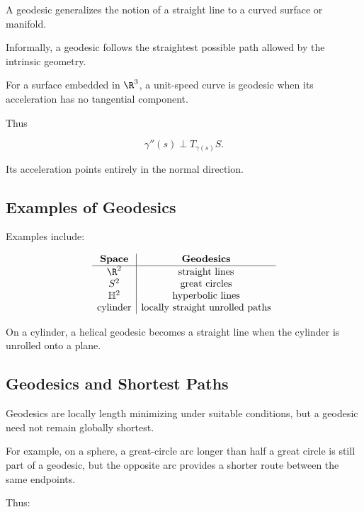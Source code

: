 A geodesic generalizes the notion of a straight line to a curved surface or
manifold.

Informally, a geodesic follows the straightest possible path allowed by the
intrinsic geometry.

For a surface embedded in \(\R^3\), a unit-speed curve is geodesic when its
acceleration has no tangential component.

Thus

\[
\boxed{
\gamma''(s)
\perp
T_{\gamma(s)}S.
}
\]

Its acceleration points entirely in the normal direction.

\subsection{Examples of Geodesics}
\label{subsec:geodesic-examples}

Examples include:

\[
\begin{array}{c|c}
\textbf{Space} & \textbf{Geodesics}\\
\hline
\R^2 & \text{straight lines}\\
S^2 & \text{great circles}\\
\mathbb{H}^2 & \text{hyperbolic lines}\\
\text{cylinder} & \text{locally straight unrolled paths}
\end{array}
\]

On a cylinder, a helical geodesic becomes a straight line when the cylinder
is unrolled onto a plane.

\subsection{Geodesics and Shortest Paths}
\label{subsec:geodesics-shortest-paths}

Geodesics are locally length minimizing under suitable conditions, but a
geodesic need not remain globally shortest.

For example, on a sphere, a great-circle arc longer than half a great circle
is still part of a geodesic, but the opposite arc provides a shorter route
between the same endpoints.

Thus:

